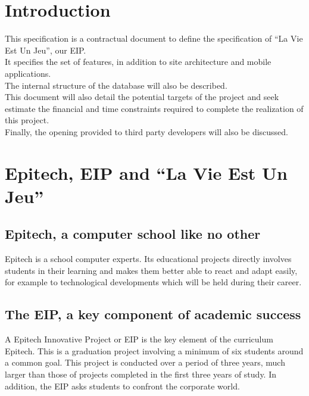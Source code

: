 \documentclass {life-en}
\begin{document}
\newpage

\tableofcontents



\chapter{Introduction}

This specification is a contractual document to define the
specification of ``La Vie Est Un Jeu'', our EIP. \\
It specifies the set of features, in addition to site architecture and
mobile applications.\\
The internal structure of the database will also be described.\\
This document will also detail the potential targets of the project and seek
estimate the financial and time constraints required to complete
the realization of this project.\\
Finally, the opening provided to third party developers will also be discussed.



\chapter{Epitech, EIP and ``La Vie Est Un Jeu''}

\section{Epitech, a computer school like no other}

Epitech is a school computer experts. Its educational projects
directly involves students in their learning and makes them better able
to react and adapt easily, for example to technological developments which
will be held during their career.

\section{The EIP, a key component of academic success}

A Epitech Innovative Project or EIP is the key element of the curriculum Epitech. This is a graduation project involving a minimum of six students around a common goal. This project is conducted over a period of three years, much larger than those of projects completed in the first three years of study. In addition, the EIP asks students to confront the corporate world.
\end{document}
